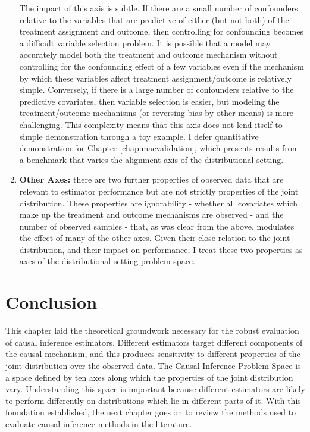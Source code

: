\documentclass[../main.tex]{subfiles}
\begin{document}
\begin{enumerate}
\vspace{\baselineskip}

The impact of this axis is subtle. If there are a small number of confounders relative to the variables that are predictive of either (but not both) of the treatment assignment and outcome, then controlling for confounding becomes a difficult variable selection problem. It is possible that a model may accurately model both the treatment and outcome mechanism without controlling for the confounding effect of a few variables even if the mechanism by which these variables affect treatment assignment/outcome is relatively simple. Conversely, if there is a large number of confounders relative to the predictive covariates, then variable selection is easier, but modeling the treatment/outcome mechanisms (or reversing bias by other means) is more challenging. This complexity means that this axis does not lend itself to simple demonstration through a toy example. I defer quantitative demonstration for Chapter \ref{chap:macvalidation}, which presents results from a benchmark that varies the alignment axis of the distributional setting.


\vspace{\baselineskip}
    \item \textbf{Other Axes:} there are two further properties of observed data that are relevant to estimator performance but are not strictly properties of the joint distribution. These properties are ignorability - whether all covariates which make up the treatment and outcome mechanisms are observed - and the number of observed samples - that, as was clear from the above, modulates the effect of many of the other axes. Given their close relation to the joint distribution, and their impact on performance, I treat these two properties as axes of the distributional setting problem space.\par

\end{enumerate}

\section{Conclusion}

This chapter laid the theoretical groundwork necessary for the robust evaluation of causal inference estimators. Different estimators target different components of the causal mechanism, and this produces sensitivity to different properties of the joint distribution over the observed data. The Causal Inference Problem Space is a space defined by ten axes along which the properties of the joint distribution vary. Understanding this space is important because different estimators are likely to perform differently on distributions which lie in different parts of it. With this foundation established, the next chapter goes on to review the methods used to evaluate causal inference methods in the literature.
\end{document}
